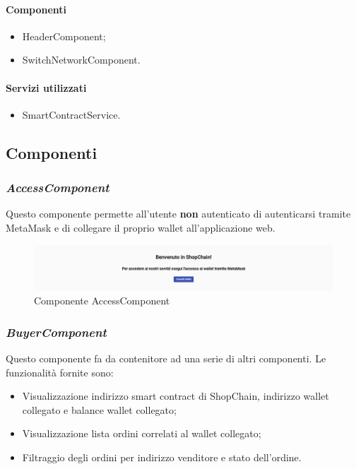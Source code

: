 \paragraph{Componenti}
\begin{itemize}
    \item HeaderComponent;
    \item SwitchNetworkComponent.
\end{itemize}

\paragraph{Servizi utilizzati}
\begin{itemize}
    \item SmartContractService.
\end{itemize}

\newpage


\subsection{Componenti}

\subsubsection*{\textit{AccessComponent}}
\label{sec:access-component}
Questo componente permette all'utente \textbf{non} autenticato di autenticarsi tramite MetaMask e di collegare il proprio wallet all'applicazione web.

\begin{figure}[!h] 
    \centering 
    \includegraphics[width=1\columnwidth]{immagini/componenti/access.png} 
    \caption{Componente AccessComponent}
\end{figure}

\subsubsection*{\textit{BuyerComponent}}
\label{sec:buyer-component}
Questo componente fa da contenitore ad una serie di altri componenti. Le funzionalità fornite sono:
\begin{itemize}
    \item Visualizzazione indirizzo smart contract di ShopChain, indirizzo wallet collegato e balance wallet collegato;
    \item Visualizzazione lista ordini correlati al wallet collegato;
    \item Filtraggio degli ordini per indirizzo venditore e stato dell'ordine.
\end{itemize}

